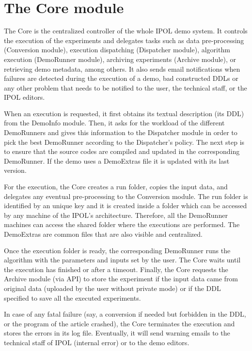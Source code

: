 \section{The Core module}
The Core is the centralized controller of the whole IPOL demo system. It controls the execution of the experiments and delegates tasks such as data pre-processing (Conversion module), execution dispatching (Dispatcher module), algorithm execution (DemoRunner module), archiving experiments (Archive module), or retrieving demo metadata, among others. It also sends email notifications when failures are detected during the execution of a demo, bad constructed DDLs or any other problem that needs to be notified to the user, the technical staff, or the IPOL editors.

When an execution is requested, it first obtains its textual description (its DDL) from the DemoInfo module. Then, it asks for the workload of the different DemoRunners and gives this information to the Dispatcher module in order to pick the best DemoRunner according to the Dispatcher's policy. The next step is to ensure that the source codes are compiled and updated in the corresponding DemoRunner. If the demo uses a DemoExtras file it is updated with its last version.

For the execution, the Core creates a run folder, copies the input data, and delegates any eventual pre-processing to the Conversion module. The run folder is identified by an unique key and it is created inside a folder which can be accessed by any machine of the IPOL's architecture. Therefore, all the DemoRunner machines can access the shared folder where the executions are performed. The DemoExtras are common files that are also visible and centralized.

Once the execution folder is ready, the corresponding DemoRunner runs the algorithm with the parameters and inputs set by the user. The Core waits until the execution has finished or after a timeout. Finally, the Core requests the Archive module (via API) to store the experiment if the input data came from original data (uploaded by the user without private mode) or if the DDL specified to save all the executed experiments.

In case of any fatal failure (say, a conversion if needed but forbidden in the DDL, or the program of the article crashed), the Core terminates the execution and stores the errors in its log file. Eventually, it will send warning emails to the technical staff of IPOL (internal error) or to the demo editors.

